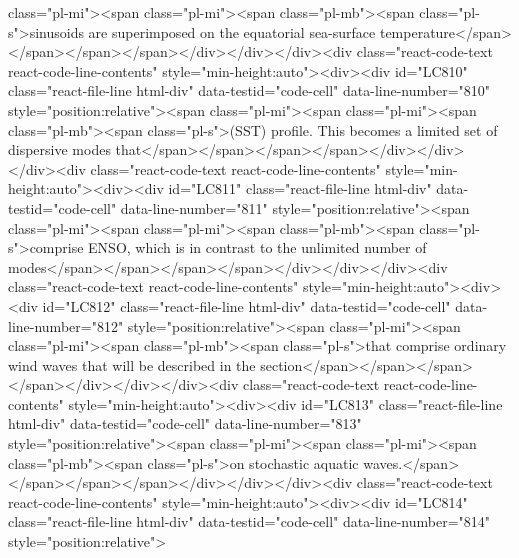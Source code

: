 {{{{{{{{class="pl-mi"><span class="pl-mi"><span class="pl-mb"><span class="pl-s">sinusoids are superimposed on the equatorial sea-surface temperature</span></span></span></span></div></div></div><div class="react-code-text react-code-line-contents" style="min-height:auto"><div><div id="LC810" class="react-file-line html-div" data-testid="code-cell" data-line-number="810" style="position:relative"><span class="pl-mi"><span class="pl-mi"><span class="pl-mb"><span class="pl-s">(SST) profile. This becomes a limited set of dispersive modes that</span></span></span></span></div></div></div><div class="react-code-text react-code-line-contents" style="min-height:auto"><div><div id="LC811" class="react-file-line html-div" data-testid="code-cell" data-line-number="811" style="position:relative"><span class="pl-mi"><span class="pl-mi"><span class="pl-mb"><span class="pl-s">comprise ENSO, which is in contrast to the unlimited number of modes</span></span></span></span></div></div></div><div class="react-code-text react-code-line-contents" style="min-height:auto"><div><div id="LC812" class="react-file-line html-div" data-testid="code-cell" data-line-number="812" style="position:relative"><span class="pl-mi"><span class="pl-mi"><span class="pl-mb"><span class="pl-s">that comprise ordinary wind waves that will be described in the section</span></span></span></span></div></div></div><div class="react-code-text react-code-line-contents" style="min-height:auto"><div><div id="LC813" class="react-file-line html-div" data-testid="code-cell" data-line-number="813" style="position:relative"><span class="pl-mi"><span class="pl-mi"><span class="pl-mb"><span class="pl-s">on stochastic aquatic waves.</span></span></span></span></div></div></div><div class="react-code-text react-code-line-contents" style="min-height:auto"><div><div id="LC814" class="react-file-line html-div" data-testid="code-cell" data-line-number="814" style="position:relative">
}}}}}}}}
